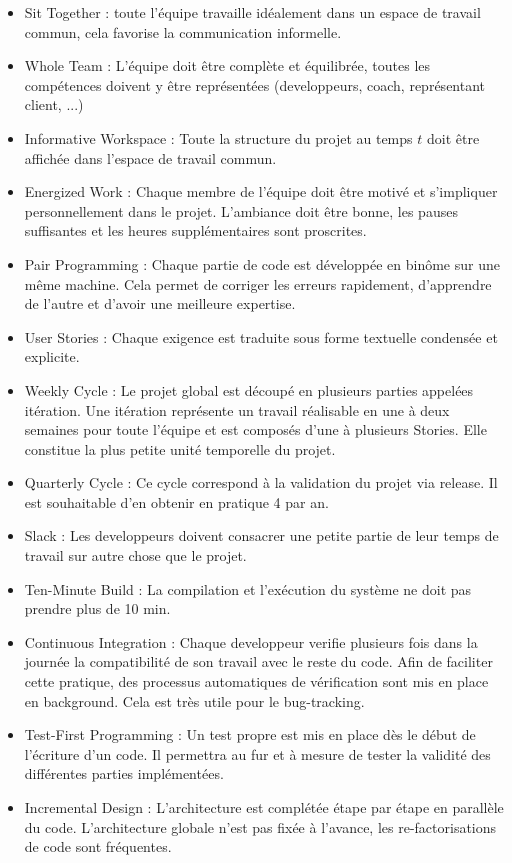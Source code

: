 \documentclass[a4paper,oneside,11pt]{report}
\begin{document}
\begin{itemize}
\item Sit Together : toute l'équipe travaille idéalement dans un espace de travail commun, cela favorise la communication informelle.
\item  Whole Team : L'équipe doit être complète et équilibrée, toutes les compétences doivent y être représentées (developpeurs, coach,  représentant client, ...)
\item Informative Workspace : Toute la structure du projet au temps $t$ doit être affichée dans l'espace de travail commun.
\item Energized Work : Chaque membre de l'équipe doit être motivé et s'impliquer personnellement dans le projet. L'ambiance doit être bonne, les pauses suffisantes et les heures supplémentaires sont proscrites.
\item Pair Programming : Chaque partie de code est développée en binôme sur une même machine. Cela permet de corriger les erreurs rapidement, d'apprendre de l'autre et d'avoir une meilleure expertise.
\item User Stories : Chaque exigence est traduite sous forme textuelle condensée et explicite.
\item Weekly Cycle : Le projet global est découpé en plusieurs parties appelées itération. Une itération représente un travail réalisable en une à deux semaines pour toute l'équipe et est composés d'une à plusieurs Stories. Elle constitue la plus petite unité temporelle du projet.
\item Quarterly Cycle : Ce cycle correspond à la validation du projet via release. Il est souhaitable d'en obtenir en pratique 4 par an.
\item Slack : Les developpeurs doivent consacrer une petite partie de leur temps de travail sur autre chose que le projet.
\item Ten-Minute Build : La compilation et l'exécution du système ne doit pas prendre plus de 10 min.
\item Continuous Integration : Chaque developpeur verifie plusieurs fois dans la journée la compatibilité de son travail avec le reste du code. Afin de faciliter cette pratique, des processus automatiques de vérification sont mis en place en background. Cela est très utile pour le bug-tracking.
\item Test-First Programming : Un test propre est mis en place dès le début de l'écriture d'un code. Il permettra au fur et à mesure de tester la validité des différentes parties implémentées.
\item Incremental Design : L'architecture est complétée étape par étape en parallèle du code. L'architecture globale n'est pas fixée à l'avance, les re-factorisations de code sont fréquentes.
\end{itemize}
\end{document}
